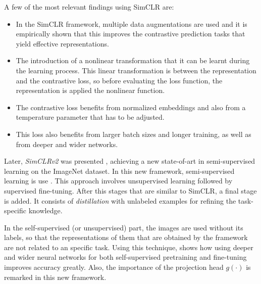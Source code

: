     
    A few of the most relevant findings using SimCLR are: 
    \begin{itemize}
    \item In the SimCLR framework, multiple data augmentations are used and it is empirically shown that this improves the contrastive prediction tasks that yield effective representations.
    
    \item The introduction of a nonlinear transformation that it can be learnt during the learning process. This linear transformation is between the representation and the contrastive loss, so before evaluating the loss function, the representation is applied the nonlinear function.
    
    \item The contrastive loss benefits from normalized embeddings and also from a temperature parameter that has to be adjusted.
    
    \item This loss also benefits from larger batch sizes and longer training, as well as from deeper and wider networks.
\end{itemize}

Later, \emph{SimCLRv2} was presented \citep{chen2020big}, achieving a new state-of-art in semi-supervised learning on the ImageNet dataset. In this new framework, semi-supervised learning is use . This approach involves unsupervised learning followed by supervised fine-tuning\footnotemark. After this stages that are similar to SimCLR,  a final stage is added. It consists of \emph{distillation} with unlabeled examples for refining the task-specific knowledge.


In the self-supervised (or unsupervised) part, the images are used without its labels, so that the representations of them that are obtained by the framework are not related to an specific task. Using this technique, \cite{chen2020big} shows how using deeper and wider neural networks for both self-supervised pretraining and fine-tuning improves accuracy greatly. Also, the importance of the projection head $g(\cdot)$ is remarked in this new framework.
